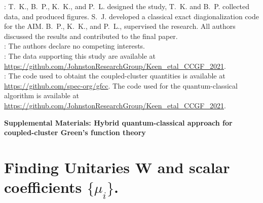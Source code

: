 \documentclass[aip,reprint,table,xcdraw,usenames,dvipsnames]{revtex4-1}
\begin{document}
: T.~K., B.~P., K.~K., and P.~L. designed the study, T.~K. and B.~P. collected data, and produced figures. S.~J. developed a classical exact diagionalization code for the AIM. B.~P., K.~K., and P.~L., supervised the research. All authors discussed the results and contributed to the final paper. \\

: The authors declare no competing interests.\\

: The data supporting this study are available at \url{https://github.com/JohnstonResearchGroup/Keen_etal_CCGF_2021}.\\

: The code used to obtaint the coupled-cluster quantities is available at \url{https://github.com/spec-org/gfcc}. The code used for the quantum-classical algorithm is available at \url{https://github.com/JohnstonResearchGroup/Keen_etal_CCGF_2021}. \\

\clearpage

\widetext
\begin{center}
\textbf{\large Supplemental Materials: Hybrid quantum-classical approach for coupled-cluster Green’s function theory}
\end{center}
\setcounter{equation}{0}
\setcounter{figure}{0}
\setcounter{table}{0}
\setcounter{page}{1}
\setcounter{section}{0}
\makeatletter
\renewcommand{\theequation}{S\arabic{equation}}
\renewcommand{\thefigure}{S\arabic{figure}}
\renewcommand{\thesection}{Supplementary Note \arabic{section}}
\renewcommand{\bibnumfmt}[1]{[S#1]}
\renewcommand{\citenumfont}[1]{S#1}


\section{Finding Unitaries $\mathbf{W}$ and scalar coefficients $\{ \mu_i \}$.} \label{sec:ccstuff}
\end{document}
